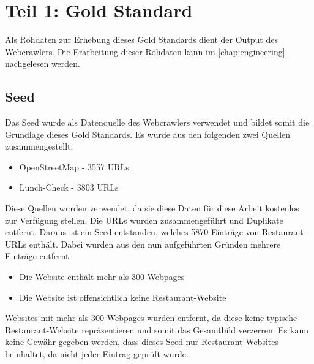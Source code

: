 \chapter{Teil 1: Gold Standard}
Als Rohdaten zur Erhebung dieses Gold Standards dient der Output des Webcrawlers.
Die Erarbeitung dieser Rohdaten kann im \cref{chap:engineering} nachgelesen werden.
\section{Seed}
Das Seed wurde als Datenquelle des Webcrawlers verwendet und bildet somit die Grundlage dieses Gold Standards.
Es wurde aus den folgenden zwei Quellen zusammengestellt:
\begin{itemize}
	\item OpenStreetMap - 3557 URLs
	\item Lunch-Check - 3803 URLs
\end{itemize}
Diese Quellen wurden verwendet, da sie diese Daten für diese Arbeit kostenlos zur Verfügung stellen.
Die URLs wurden zusammengeführt und Duplikate entfernt.
Daraus ist ein Seed entstanden, welches 5870 Einträge von Restaurant-URLs enthält.
Dabei wurden aus den nun aufgeführten Gründen mehrere Einträge entfernt:
\begin{itemize}
	\item Die Website enthält mehr als 300 Webpages
	\item Die Website ist offensichtlich keine Restaurant-Website
\end{itemize}
Websites mit mehr als 300 Webpages wurden entfernt, da diese keine typische Restaurant-Website repräsentieren und somit das Gesamtbild verzerren.
Es kann keine Gewähr gegeben werden, dass dieses Seed nur Restaurant-Websites beinhaltet, da nicht jeder Eintrag geprüft wurde.
